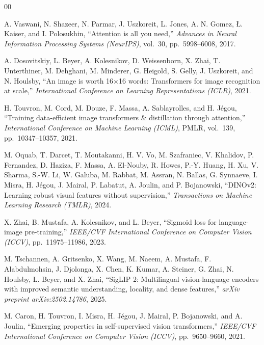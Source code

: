 \documentclass[journal]{IEEEtran}
\begin{document}
\begin{thebibliography}{00}

A. Vaswani, N. Shazeer, N. Parmar, J. Uszkoreit, L. Jones, A. N. Gomez, \L{}. Kaiser,
and I. Polosukhin,
``Attention is all you need,''
\textit{Advances in Neural Information Processing Systems (NeurIPS)},
vol.~30, pp.~5998--6008, 2017.

A. Dosovitskiy, L. Beyer, A. Kolesnikov, D. Weissenborn, X. Zhai, T. Unterthiner,
M. Dehghani, M. Minderer, G. Heigold, S. Gelly, J. Uszkoreit, and N. Houlsby,
``An image is worth 16$\times$16 words: Transformers for image recognition at scale,''
\textit{International Conference on Learning Representations (ICLR)}, 2021.

H. Touvron, M. Cord, M. Douze, F. Massa, A. Sablayrolles, and H. Jégou,
``Training data-efficient image transformers \& distillation through attention,''
\textit{International Conference on Machine Learning (ICML)},
PMLR, vol.~139, pp.~10347--10357, 2021.

M. Oquab, T. Darcet, T. Moutakanni, H. V. Vo, M. Szafraniec, V. Khalidov,
P. Fernandez, D. Haziza, F. Massa, A. El-Nouby, R. Howes, P.-Y. Huang,
H. Xu, V. Sharma, S.-W. Li, W. Galuba, M. Rabbat, M. Assran, N. Ballas,
G. Synnaeve, I. Misra, H. Jégou, J. Mairal, P. Labatut, A. Joulin, and P. Bojanowski,
``DINOv2: Learning robust visual features without supervision,''
\textit{Transactions on Machine Learning Research (TMLR)}, 2024.

X. Zhai, B. Mustafa, A. Kolesnikov, and L. Beyer,
``Sigmoid loss for language-image pre-training,''
\textit{IEEE/CVF International Conference on Computer Vision (ICCV)},
pp.~11975--11986, 2023.

M. Tschannen, A. Gritsenko, X. Wang, M. Naeem, A. Mustafa, F. Alabdulmohsin,
J. Djolonga, X. Chen, K. Kumar, A. Steiner, G. Zhai, N. Houlsby, L. Beyer,
and X. Zhai,
``SigLIP 2: Multilingual vision-language encoders with improved semantic understanding,
locality, and dense features,''
\textit{arXiv preprint arXiv:2502.14786}, 2025.

M. Caron, H. Touvron, I. Misra, H. Jégou, J. Mairal, P. Bojanowski, and A. Joulin,
``Emerging properties in self-supervised vision transformers,''
\textit{IEEE/CVF International Conference on Computer Vision (ICCV)},
pp.~9650--9660, 2021.


\end{thebibliography}
\end{document}
